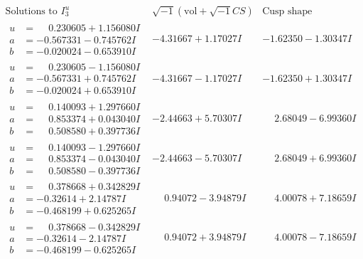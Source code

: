 \documentclass[1p]{elsarticle_modified}
\theoremstyle{definition}
\newcommand{\I}{\sqrt{-1}}
\begin{document}
$$\begin{array}{c|c|c}  
\text{Solutions to }I^u_{3}& \I (\text{vol} + \sqrt{-1}CS) & \text{Cusp shape}\\
 \hline 
\begin{aligned}
u &= \phantom{-}0.230605 + 1.156080 I \\
a &= -0.567331 - 0.745762 I \\
b &= -0.020024 - 0.653910 I\end{aligned}
 & -4.31667 + 1.17027 I & -1.62350 - 1.30347 I \\ \hline\begin{aligned}
u &= \phantom{-}0.230605 - 1.156080 I \\
a &= -0.567331 + 0.745762 I \\
b &= -0.020024 + 0.653910 I\end{aligned}
 & -4.31667 - 1.17027 I & -1.62350 + 1.30347 I \\ \hline\begin{aligned}
u &= \phantom{-}0.140093 + 1.297660 I \\
a &= \phantom{-}0.853374 + 0.043040 I \\
b &= \phantom{-}0.508580 + 0.397736 I\end{aligned}
 & -2.44663 + 5.70307 I & \phantom{-}2.68049 - 6.99360 I \\ \hline\begin{aligned}
u &= \phantom{-}0.140093 - 1.297660 I \\
a &= \phantom{-}0.853374 - 0.043040 I \\
b &= \phantom{-}0.508580 - 0.397736 I\end{aligned}
 & -2.44663 - 5.70307 I & \phantom{-}2.68049 + 6.99360 I \\ \hline\begin{aligned}
u &= \phantom{-}0.378668 + 0.342829 I \\
a &= -0.32614 + 2.14787 I \\
b &= -0.468199 + 0.625265 I\end{aligned}
 & \phantom{-}0.94072 - 3.94879 I & \phantom{-}4.00078 + 7.18659 I \\ \hline\begin{aligned}
u &= \phantom{-}0.378668 - 0.342829 I \\
a &= -0.32614 - 2.14787 I \\
b &= -0.468199 - 0.625265 I\end{aligned}
 & \phantom{-}0.94072 + 3.94879 I & \phantom{-}4.00078 - 7.18659 I \\ \hline\begin{aligned}

\end{aligned}
\end{array}$$
\end{document}
